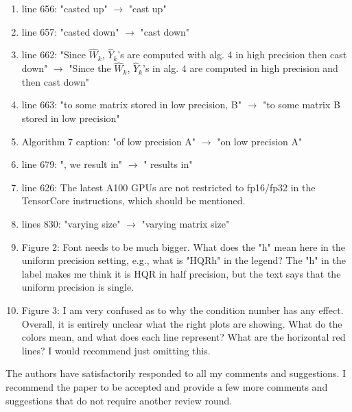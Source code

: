 \documentclass[final,onefignum,onetabnum]{siamart190516}
\begin{document}
\begin{enumerate}
	\item line 656: "casted up" $\rightarrow$ "cast up"
	
	\item line 657: "casted down" $\rightarrow$ "cast down"
	
	\item line 662: "Since $\hat{W}_k$, $\hat{Y}_k$'s are computed with alg. 4 in high precision then cast down" $\rightarrow$ "Since the $\hat{W}_k$, $\hat{Y}_k$'s in alg. 4 are computed in high precision and then cast down"
	
	\item line 663: "to some matrix stored in low precision, B" $\rightarrow$ "to some matrix B stored in low precision"
	
	\item Algorithm 7 caption: "of low precision A" $\rightarrow$ "on low precision A"
	
	\item line 679: ", we result in" $\rightarrow$ " results in"
	
	\item line 626: The latest A100 GPUs are not restricted to fp16/fp32 in the TensorCore instructions, which should be mentioned.
	
	\item lines 830: "varying size" $\rightarrow$ "varying matrix size"
	
	\item Figure 2: Font needs to be much bigger. What does the "h" mean here in the uniform precision setting, e.g., what is "HQRh" in the legend? The "h" in the label makes me think it is HQR in half precision, but the text says that the uniform precision is single. 
	
	
	\item Figure 3: I am very confused as to why the condition number has any effect. Overall, it is entirely unclear what the right plots are showing. What do the colors mean, and what does each line represent? What are the horizontal red lines? I would recommend just omitting this. 
	
\end{enumerate}
The authors have satisfactorily responded to all my comments and suggestions. I
recommend the paper to be accepted and provide a few more comments and suggestions
that do not require another review round.
\end{document}
